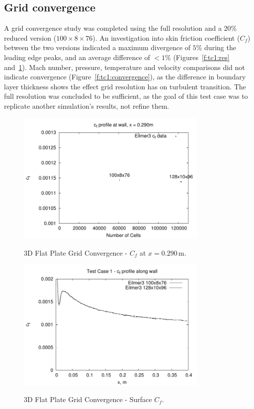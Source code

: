 \subsection{Grid convergence}
A grid convergence study was completed using the full resolution and a $20\%$ reduced version ($100\times8\times76$). An investigation into skin friction coefficient ($C_f$) between the two versions indicated a maximum divergence of $5\%$ during the leading edge peaks, and an average difference of $<1\%$ (Figures~\ref{f:tc1:res} and~\ref{f:tc1:comp}). Mach number, pressure, temperature and velocity comparisons did not indicate convergence (Figure~\ref{f:tc1:convergence}), as the difference in boundary layer thickness shows the effect grid resolution has on turbulent transition. The full resolution was concluded to be sufficient, as the goal of this test case was to replicate another simulation's results, not refine them. 
%
\begin{figure}[h]
 \begin{center}
  \includegraphics[width=9.2cm]{./chap6-3Dflatplate/figs/gridconverge/tc1-cf-resolution.pdf}
  \caption{3D Flat Plate Grid Convergence - $C_f$ at $x=0.290$\,m.}
  \label{f:tc1:res}
  \vspace{1cm}
  \includegraphics[width=9.2cm]{./chap6-3Dflatplate/figs/gridconverge/tc1-cf-comparison.pdf}
  \caption{3D Flat Plate Grid Convergence - Surface $C_f$.}
  \label{f:tc1:comp}
 \end{center}
\end{figure}
